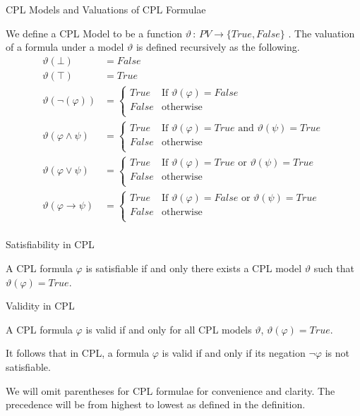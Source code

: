 \documentclass{llncs}
\begin{document}
\begin{definition}{CPL Models and Valuations of CPL Formulae}\label{CPL Model}

We define a CPL Model to be a function $\vartheta \, : \, PV \rightarrow
\{True, False\}$ \cite{kelly2009revised}. The valuation of a formula under a
model $\vartheta$ is defined recursively as the following.
%
\begin{align*}
\vartheta (\bot) &= False \\
\vartheta (\top) &= True \\
\vartheta (\neg(\varphi)) &=
\begin{cases}
True & \textrm{If } \vartheta(\varphi) = False \\
False & \textrm{otherwise} \\
\end{cases} \\
\vartheta (\varphi \wedge \psi) &=
\begin{cases}
True & \textrm{If } \vartheta(\varphi) = True \textrm{ and } \vartheta(\psi) =
True \\
False & \textrm{otherwise} \\
\end{cases} \\
\vartheta (\varphi \vee \psi) &=
\begin{cases}
True & \textrm{If } \vartheta(\varphi) = True \textrm{ or } \vartheta(\psi) =
True \\
False & \textrm{otherwise} \\
\end{cases} \\
\vartheta (\varphi \rightarrow \psi) &=
\begin{cases}
True & \textrm{If } \vartheta(\varphi) = False \textrm{ or } \vartheta(\psi) =
True \\
False & \textrm{otherwise} \\
\end{cases} \\
\end{align*}
%
\end{definition}
\begin{definition}{Satisfiability in CPL}\label{Satisfiability in CPL}

A CPL formula $\varphi$ is satisfiable if and only there exists a CPL model
$\vartheta$ such that $\vartheta(\varphi) = True$.
\end{definition}
\begin{definition}{Validity in CPL}\label{Validity in CPL}

A CPL formula $\varphi$ is valid if and only for all CPL models
$\vartheta$, $\vartheta(\varphi) = True$.

It follows that in CPL, a formula $\varphi$ is valid if and only if its
negation $\neg \varphi$ is not satisfiable.
\end{definition}
%
We will omit parentheses for CPL formulae for convenience and clarity. The
precedence will be from highest to lowest as defined in the definition.
%
\end{document}
